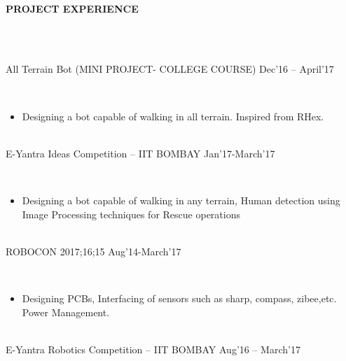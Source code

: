 \documentclass[a4paper,12pt]{report}
\begin{document}
\begin{adjustwidth}{-0.59in}{0.0in}
\\
\vspace{1cm}
\textbf{PROJECT EXPERIENCE}
\end{adjustwidth}
 \\
\vspace{12pt}
\begin{adjustwidth}{0.0in}{-0.52in}
\\
All Terrain Bot (MINI PROJECT- COLLEGE COURSE)  \hspace{10pt}  \hspace{10pt}  \hspace{10pt}        \hspace{10pt}                                   Dec’16 – April’17
\end{adjustwidth}
 \\
\begin{itemize}
\item Designing a bot capable of walking in all terrain. Inspired from RHex. \\
\end{itemize}
\begin{adjustwidth}{0.0in}{-0.52in}
\\
E-Yantra Ideas Competition – IIT BOMBAY                                                                                                         Jan’17-March’17
\end{adjustwidth}
 \\
\begin{itemize}
\item Designing a bot capable of walking in any terrain, Human detection using Image Processing techniques  for Rescue operations \\
\end{itemize}
\begin{adjustwidth}{0.0in}{-0.52in}
\\
ROBOCON 2017;16;15                                                                                                                                             Aug’14-March’17
\end{adjustwidth}
 \\
\begin{itemize}
\item Designing PCBs, Interfacing of sensors such as sharp, compass, zibee,etc. Power Management. \\
\end{itemize}
\begin{adjustwidth}{0.0in}{-0.52in}
\\
E-Yantra Robotics Competition – IIT BOMBAY \hspace{10pt}  \hspace{10pt}  \hspace{10pt}  \hspace{10pt}  \hspace{10pt}  \hspace{10pt}   \hspace{10pt}    Aug’16 – March’17
\end{adjustwidth}
\end{document}
